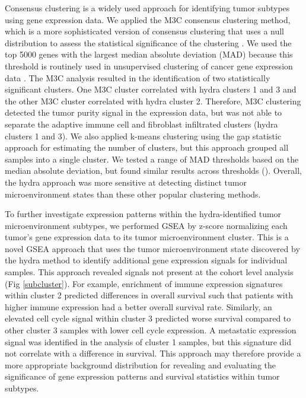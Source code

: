\documentclass[10pt,letterpaper]{article}
\begin{document}
Consensus clustering is a widely used approach for identifying tumor subtypes using gene expression data. We applied the M3C consensus clustering method, which is a more sophisticated version of consensus clustering that uses a null distribution to assess the statistical significance of the clustering \cite{johnM3CMonteCarlo2018, wilkersonConsensusClusterPlusClassDiscovery2010a}. We used the top 5000 genes with the largest median absolute deviation (MAD) because this threshold is routinely used in unsupervised clustering of cancer gene expression data \cite{bourgonIndependentFilteringIncreases2010, tritchlerFilteringGenesCluster2009, carcamo-oriveAnalysisTranscriptionalVariability2017}. The M3C analysis resulted in the identification of two statistically significant clusters. One M3C cluster correlated with hydra clusters 1 and 3 and the other M3C cluster correlated with hydra cluster 2. Therefore, M3C clustering detected the tumor purity signal in the expression data, but was not able to separate the adaptive immune cell and fibroblast infiltrated clusters (hydra clusters 1 and 3). We also applied k-means clustering using the gap statistic approach \cite{tibshirani2001estimating,maechler2012cluster} for estimating the number of clusters, but this approach grouped all samples into a single cluster. We tested a range of MAD thresholds based on the median absolute deviation, but found similar results across thresholds (). Overall, the hydra approach was more sensitive at detecting distinct tumor microenvironment states than these other popular clustering methods.

To further investigate expression patterns within the hydra-identified tumor microenvironment subtypes, we performed GSEA by z-score normalizing each tumor’s gene expression data to its tumor microenvironment cluster. This is a novel GSEA approach that uses the tumor microenvironment state discovered by the hydra method to identify additional gene expression signals for individual samples. This approach revealed signals not present at the cohort level analysis (Fig \ref{subcluster}). For example, enrichment of immune expression signatures within cluster 2 predicted differences in overall survival such that patients with higher immune expression had a better overall survival rate. Similarly, an elevated cell cycle signal within cluster 3 predicted worse survival compared to other cluster 3 samples with lower cell cycle expression. A metastatic expression signal was identified in the analysis of cluster 1 samples, but this signature did not correlate with a difference in survival. This approach may therefore provide a more appropriate background distribution for revealing and evaluating the significance of gene expression patterns and survival statistics within tumor subtypes.
\end{document}
